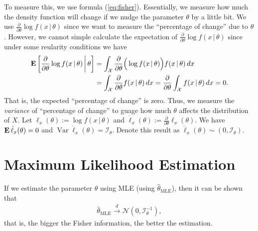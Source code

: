 \documentclass[a4paper,11pt]{article}
\newcommand{\dd}{\,d}
\DeclareMathOperator{\E}{\text{\textrm{\upshape\textbf{E}}}}
\DeclareMathOperator{\var}{Var}
\newcommand{\dto}{\overset{d}{\longrightarrow}}
\newcommand{\given}[1][]{\,#1|\,}
\newcommand{\normal}[1]{\mathcal{N}\left(#1\right)}
\newcommand{\inv}{^{-1}}
\begin{document}
To measure this, we use formula (\ref{eq:fisher}).
Essentially, we measure how much the density function will change if we nudge
the parameter $\theta$ by a little bit.
We use $\frac{\partial}{\partial\theta}\log f(x\given\theta)$ since we want 
to measure the ``percentage of change'' due to $\theta$.
However, we cannot simple calculate the expectation of $\frac{\partial}{\partial\theta}\log f(x\given\theta)$ since under some reularity conditions we have
\begin{align*}
	\E\left[\frac{\partial}{\partial\theta}\log f(x\given\theta)\given[\middle]\theta\right]
	&= \int_{\mathcal{X}} \frac{\partial}{\partial\theta}\Big(\log f(x\given\theta)\Big) f(x\given\theta) \dd{x} \\
	&= \int_{\mathcal{X}} \frac{\partial}{\partial\theta}f(x\given\theta) \dd{x}
	= \frac{\partial}{\partial\theta} \int_{\mathcal{X}} f(x\given\theta) \dd{x}
	= 0.
\end{align*}
That is, the expected ``percentage of change'' is zero.
Thus, we measure the \emph{variance} of ``percentage of change'' to guage how much $\theta$ affects the distribution of $X$.
Let $\ell_{x}(\theta):=\log f(x\given\theta)$ and
$\dot\ell_{x}(\theta):=\frac{\partial}{\partial\theta}\ell_{x}(\theta)$.
We have $\E{\dot\ell_{x}(\theta)}=0$ and $\var{\dot\ell_{x}(\theta)}=\mathcal{I}_{\theta}$.
Denote this result as $\dot\ell_{x}(\theta)\sim(0,\mathcal{I}_{\theta})$.

\section{Maximum Likelihood Estimation}

If we estimate the parameter $\theta$ using MLE (using $\hat{\theta}_{\text{MLE}}$),
then it can be shown that
\begin{align}\label{eq:mle}
	\hat{\theta}_{\text{MLE}}
	\dto
	\normal{0,\mathcal{I}_{\theta}\inv},
\end{align}
that is, the bigger the Fisher information, the better the estimation.
\end{document}
